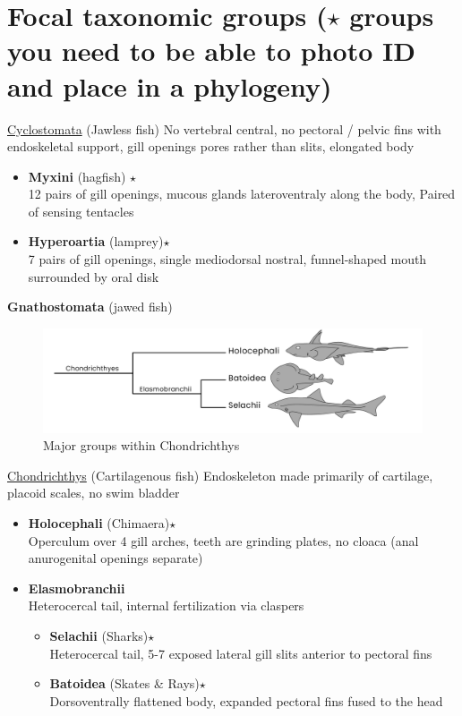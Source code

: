 \documentclass[a4paper,12pt]{article}
\begin{document}
\section*{Focal taxonomic groups ($\star$ groups you need to be able to photo ID and place in a phylogeny)}
\begin{description}
\item{\underline{{\LARGE{Cyclostomata}}}} (Jawless fish) No vertebral central, no pectoral / pelvic fins with endoskeletal support, gill openings pores rather than slits, elongated body
\begin{itemize}
  \item{\textbf{Myxini} (hagfish) $\star$}\\ 12 pairs of gill openings, mucous glands lateroventraly along the body, Paired of sensing tentacles
  \item{\textbf{Hyperoartia} (lamprey)$\star$}\\ 7 pairs of gill openings, single mediodorsal nostral, funnel-shaped mouth surrounded by oral disk
\end{itemize}
\item\textbf{Gnathostomata} (jawed fish)

\begin{figure}[H]
\centering
  \includegraphics[scale=0.4]{Chondrichthys_tre.pdf}
  \caption{Major groups within Chondrichthys}
  \label{fig:Chondrichthys}
\end{figure}

\item{\underline{{\LARGE{Chondrichthys}}}}
(Cartilagenous fish) Endoskeleton made primarily of cartilage, placoid scales, no swim bladder
\begin{itemize}
  \item{\textbf{Holocephali} (Chimaera)$\star$}\\ Operculum over 4 gill arches, teeth are grinding plates, no cloaca (anal anurogenital openings separate)
  \item{\textbf{Elasmobranchii}} \\ Heterocercal tail, internal fertilization via claspers
  \begin{itemize}
    \item{\textbf{Selachii} (Sharks)$\star$}\\ Heterocercal tail, 5-7 exposed lateral gill slits anterior to pectoral fins
    \item{\textbf{Batoidea} (Skates \& Rays)$\star$} \\ Dorsoventrally flattened body, expanded pectoral fins fused to the head
  \end{itemize}
\end{itemize}



\end{description}
\end{document}

